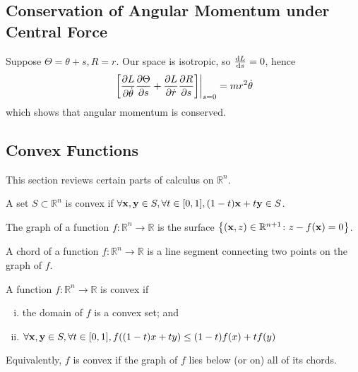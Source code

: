 \subsection{Conservation of Angular Momentum under Central Force}
\begin{example}
    Suppose \( \Theta = \theta + s, R = r \). Our space is isotropic, so \( \dv{L}{s} = 0 \), hence
    \[ \eval{\qty[\pdv{L}{\dot\theta}\pdv{\Theta}{s} + \pdv{L}{\dot r}\pdv{R}{s}]}_{s=0} = mr^2\dot\theta \]
    which shows that angular momentum is conserved.
\end{example}

\subsection{Convex Functions}
This section reviews certain parts of calculus on \( \mathbb R^n \).
\begin{definition}
    A set \( S \subset \mathbb R^n \) is convex if \( \forall \vb x, \vb y \in S, \forall t \in [0,1], (1-t)\vb x + t \vb y \in S \).
\end{definition}
\begin{definition}
    The graph of a function \( f \colon \mathbb R^n \to \mathbb R \) is the surface \( \qty{ (\vb x, z)\in \mathbb R^{n+1} \colon z - f(\vb x) = 0} \).
\end{definition}
\begin{definition}
    A chord of a function \( f \colon \mathbb R^n \to \mathbb R \) is a line segment connecting two points on the graph of \( f \).
\end{definition}
\begin{definition}
    A function \( f \colon \mathbb R^n \to \mathbb R \) is convex if
    \begin{enumerate}[(i)]
        \item the domain of \( f \) is a convex set; and
        \item \( \forall \vb x, \vb y \in S, \forall t \in [0,1], f((1-t)x + ty) \leq (1-t)f(x) + tf(y) \)
    \end{enumerate}
    Equivalently, \( f \) is convex if the graph of \( f \) lies below (or on) all of its chords.
\end{definition}
